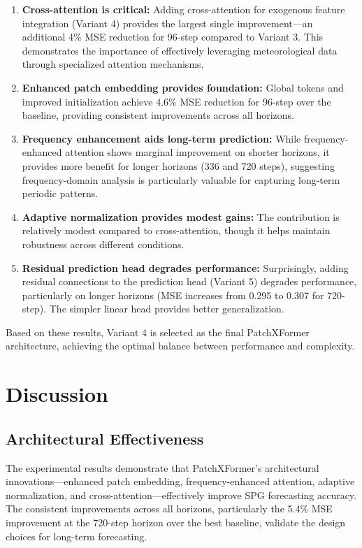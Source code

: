 \documentclass[a4paper,fleqn]{cas-dc}
\begin{document}
\begin{enumerate}
\item \textbf{Cross-attention is critical:} Adding cross-attention for exogenous feature integration (Variant 4) provides the largest single improvement---an additional 4\% MSE reduction for 96-step compared to Variant 3. This demonstrates the importance of effectively leveraging meteorological data through specialized attention mechanisms.

\item \textbf{Enhanced patch embedding provides foundation:} Global tokens and improved initialization achieve 4.6\% MSE reduction for 96-step over the baseline, providing consistent improvements across all horizons.

\item \textbf{Frequency enhancement aids long-term prediction:} While frequency-enhanced attention shows marginal improvement on shorter horizons, it provides more benefit for longer horizons (336 and 720 steps), suggesting frequency-domain analysis is particularly valuable for capturing long-term periodic patterns.

\item \textbf{Adaptive normalization provides modest gains:} The contribution is relatively modest compared to cross-attention, though it helps maintain robustness across different conditions.

\item \textbf{Residual prediction head degrades performance:} Surprisingly, adding residual connections to the prediction head (Variant 5) degrades performance, particularly on longer horizons (MSE increases from 0.295 to 0.307 for 720-step). The simpler linear head provides better generalization.
\end{enumerate}

Based on these results, Variant 4 is selected as the final PatchXFormer architecture, achieving the optimal balance between performance and complexity.

\section{Discussion}\label{sec:discussion}

\subsection{Architectural Effectiveness}

The experimental results demonstrate that PatchXFormer's architectural innovations---enhanced patch embedding, frequency-enhanced attention, adaptive normalization, and cross-attention---effectively improve SPG forecasting accuracy. The consistent improvements across all horizons, particularly the 5.4\% MSE improvement at the 720-step horizon over the best baseline, validate the design choices for long-term forecasting.
\end{document}
